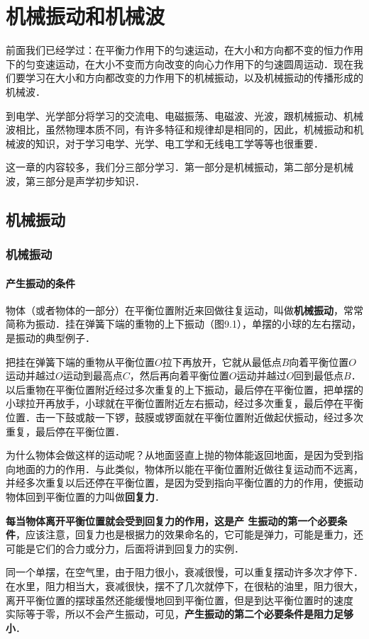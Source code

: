 \chapter{机械振动和机械波}
前面我们已经学过：在平衡力作用下的匀速运动，在大小和方向都不变的恒力作用下的匀变速运动，在大小不变而方向改变的向心力作用下的匀速圆周运动．现在我们要学习在大小和方向都改变的力作用下的机械振动，以及机械振动的传播形成的机械波．

到电学、光学部分将学习的交流电、电磁振荡、电磁波、光波，跟机械振动、机械波相比，虽然物理本质不同，有许多特征和规律却是相同的，因此，机械振动和机械波的知识，对于学习电学、光学、电工学和无线电工学等等也很重要．

这一章的内容较多，我们分三部分学习．第一部分是机械振动，第二部分是机械波，第三部分是声学初步知识．
\section{机械振动}
\subsection{机械振动}
\subsubsection{产生振动的条件}

物体（或者物体的一部分）在平衡位置附近来回做往复运动，叫做\textbf{机械振动}，常常简称为振动．挂在弹簧下端的重物的上下振动（图9.1），单摆的小球的左右摆动，是振动的典型例子．

把挂在弹簧下端的重物从平衡位置$O$拉下再放开，它就从最低点$B$向着平衡位置$O$运动并越过$O$运动到最高点$C$，然后再向着平衡位置$O$运动并越过$O$回到最低点$B$．以后重物在平衡位置附近经过多次重复的上下振动，最后停在平衡位置，把单摆的小球拉开再放手，小球就在平衡位置附近左右振动，经过多次重复，最后停在平衡位置．击一下鼓或敲一下锣，鼓膜或锣面就在平衡位置附近做起伏振动，经过多次重复，最后停在平衡位置．

为什么物体会做这样的运动呢？从地面竖直上抛的物体能返回地面，是因为受到指向地面的力的作用．与此类似，物体所以能在平衡位置附近做往复运动而不远离，并经多次重复以后还停在平衡位置，是因为受到指向平衡位置的力的作用，使振动物体回到平衡位置的力叫做\textbf{回复力}．

\textbf{每当物体离开平衡位置就会受到回复力的作用，这是产
    生振动的第一个必要条件}，应该注意，回复力也是根据力的效果命名的，它可能是弹力，可能是重力，还可能是它们的合力或分力，后面将讲到回复力的实例．

同一个单摆，在空气里，由于阻力很小，衰减很慢，可以重复摆动许多次才停下．在水里，阻力相当大，衰减很快，摆不了几次就停下，在很粘的油里，阻力很大，离开平衡位置的摆球虽然还能缓慢地回到平衡位置，但是到达平衡位置时的速度
实际等于零，所以不会产生振动，可见，\textbf{产生振动的第二个必要条件是阻力足够小}．

